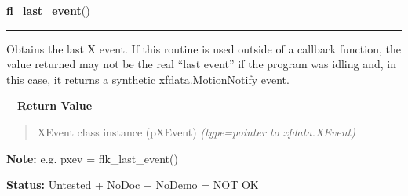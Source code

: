 \hspace{.8\funcindent}\begin{boxedminipage}{\funcwidth}

    \raggedright \textbf{fl\_last\_event}()

    \vspace{-1.5ex}

    \rule{\textwidth}{0.5\fboxrule}
\setlength{\parskip}{2ex}

Obtains the last X event. If this routine is used outside of a callback
function, the value returned may not be the real ``last event'' if the
program was idling and, in this case, it returns a synthetic
xfdata.MotionNotify event.

-{}-
\setlength{\parskip}{1ex}
      \textbf{Return Value}
    \vspace{-1ex}

      \begin{quote}

XEvent class instance (pXEvent)
      {\it (type=pointer to xfdata.XEvent)}

      \end{quote}

\textbf{Note:} 
e.g. pxev = flk\_last\_event()


\textbf{Status:} 
Untested + NoDoc + NoDemo = NOT OK


    \end{boxedminipage}

    \label{xformslib:flxbasic:fl_set_event_callback}

    \vspace{0.5ex}

